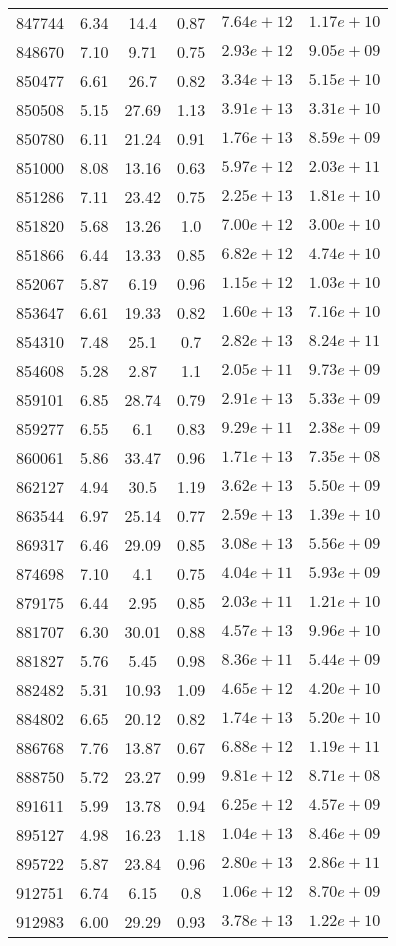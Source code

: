 \begin{table}
\begin{tabular}{cccccc}
847744 & 6.34 & 14.4 & 0.87 & $7.64e+12$ & $1.17e+10$ \\
848670 & 7.10 & 9.71 & 0.75 & $2.93e+12$ & $9.05e+09$ \\
850477 & 6.61 & 26.7 & 0.82 & $3.34e+13$ & $5.15e+10$ \\
850508 & 5.15 & 27.69 & 1.13 & $3.91e+13$ & $3.31e+10$ \\
850780 & 6.11 & 21.24 & 0.91 & $1.76e+13$ & $8.59e+09$ \\
851000 & 8.08 & 13.16 & 0.63 & $5.97e+12$ & $2.03e+11$ \\
851286 & 7.11 & 23.42 & 0.75 & $2.25e+13$ & $1.81e+10$ \\
851820 & 5.68 & 13.26 & 1.0 & $7.00e+12$ & $3.00e+10$ \\
851866 & 6.44 & 13.33 & 0.85 & $6.82e+12$ & $4.74e+10$ \\
852067 & 5.87 & 6.19 & 0.96 & $1.15e+12$ & $1.03e+10$ \\
853647 & 6.61 & 19.33 & 0.82 & $1.60e+13$ & $7.16e+10$ \\
854310 & 7.48 & 25.1 & 0.7 & $2.82e+13$ & $8.24e+11$ \\
854608 & 5.28 & 2.87 & 1.1 & $2.05e+11$ & $9.73e+09$ \\
859101 & 6.85 & 28.74 & 0.79 & $2.91e+13$ & $5.33e+09$ \\
859277 & 6.55 & 6.1 & 0.83 & $9.29e+11$ & $2.38e+09$ \\
860061 & 5.86 & 33.47 & 0.96 & $1.71e+13$ & $7.35e+08$ \\
862127 & 4.94 & 30.5 & 1.19 & $3.62e+13$ & $5.50e+09$ \\
863544 & 6.97 & 25.14 & 0.77 & $2.59e+13$ & $1.39e+10$ \\
869317 & 6.46 & 29.09 & 0.85 & $3.08e+13$ & $5.56e+09$ \\
874698 & 7.10 & 4.1 & 0.75 & $4.04e+11$ & $5.93e+09$ \\
879175 & 6.44 & 2.95 & 0.85 & $2.03e+11$ & $1.21e+10$ \\
881707 & 6.30 & 30.01 & 0.88 & $4.57e+13$ & $9.96e+10$ \\
881827 & 5.76 & 5.45 & 0.98 & $8.36e+11$ & $5.44e+09$ \\
882482 & 5.31 & 10.93 & 1.09 & $4.65e+12$ & $4.20e+10$ \\
884802 & 6.65 & 20.12 & 0.82 & $1.74e+13$ & $5.20e+10$ \\
886768 & 7.76 & 13.87 & 0.67 & $6.88e+12$ & $1.19e+11$ \\
888750 & 5.72 & 23.27 & 0.99 & $9.81e+12$ & $8.71e+08$ \\
891611 & 5.99 & 13.78 & 0.94 & $6.25e+12$ & $4.57e+09$ \\
895127 & 4.98 & 16.23 & 1.18 & $1.04e+13$ & $8.46e+09$ \\
895722 & 5.87 & 23.84 & 0.96 & $2.80e+13$ & $2.86e+11$ \\
912751 & 6.74 & 6.15 & 0.8 & $1.06e+12$ & $8.70e+09$ \\
912983 & 6.00 & 29.29 & 0.93 & $3.78e+13$ & $1.22e+10$ \\
\end{tabular}
\end{table}
